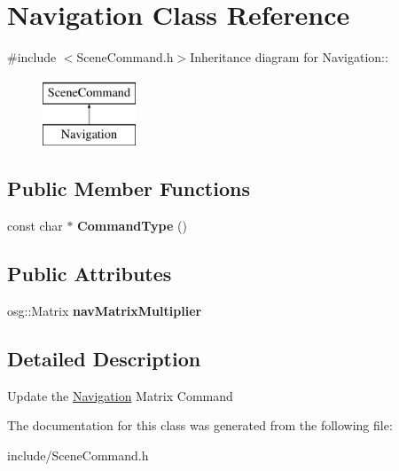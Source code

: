 \hypertarget{class_navigation}{
\section{Navigation Class Reference}
\label{class_navigation}
}


{\ttfamily \#include $<$SceneCommand.h$>$}Inheritance diagram for Navigation::\begin{figure}[H]
\begin{center}
\leavevmode
\includegraphics[height=2cm]{class_navigation}
\end{center}
\end{figure}
\subsection*{Public Member Functions}
\begin{DoxyCompactItemize}
\item 
\hypertarget{class_navigation_a48dbfe3dec8d1e781cc56a7feaa68bf2}{
const char $\ast$ {\bfseries CommandType} ()}
\label{class_navigation_a48dbfe3dec8d1e781cc56a7feaa68bf2}

\end{DoxyCompactItemize}
\subsection*{Public Attributes}
\begin{DoxyCompactItemize}
\item 
\hypertarget{class_navigation_af66677e95a44bd5119c4d831a888a588}{
osg::Matrix {\bfseries navMatrixMultiplier}}
\label{class_navigation_af66677e95a44bd5119c4d831a888a588}

\end{DoxyCompactItemize}


\subsection{Detailed Description}
Update the \hyperlink{class_navigation}{Navigation} Matrix Command 

The documentation for this class was generated from the following file:\begin{DoxyCompactItemize}
\item 
include/SceneCommand.h\end{DoxyCompactItemize}
